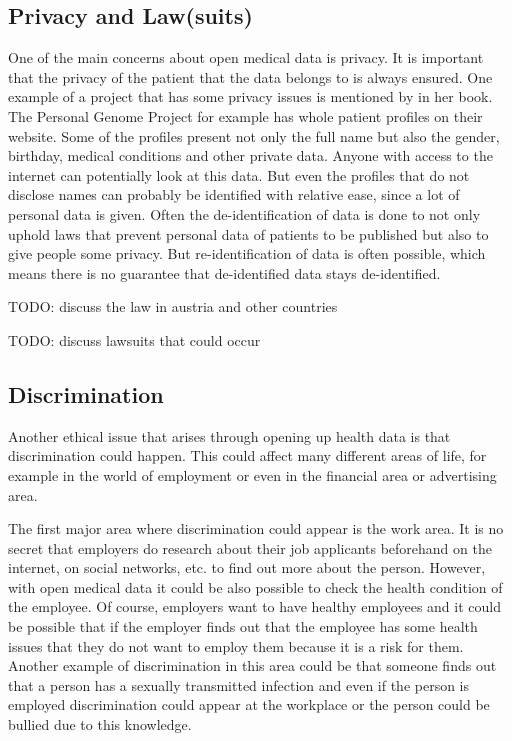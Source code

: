 \documentclass[a4paper, 11pt]{article}
\begin{document}
\subsection{Privacy and Law(suits)}
One of the main concerns about open medical data is privacy. It is important that the privacy of the patient that the data belongs to is always ensured. One example of a project that has some privacy issues is mentioned by \citet{Hoffman2015} in her book. The Personal Genome Project for example has whole patient profiles on their website. \cite{ParticipantProfiles} Some of the profiles present not only the full name but also the gender, birthday, medical conditions and other private data. Anyone with access to the internet can potentially look at this data. But even the profiles that do not disclose names can probably be identified with relative ease, since a lot of personal data is given. Often the de-identification of data is done to not only uphold laws that prevent personal data of patients to be published but also to give people some privacy. But re-identification of data is often possible, which means there is no guarantee that de-identified data stays de-identified. \cite{Hoffman2015, ParticipantProfiles}

TODO: discuss the law in austria and other countries

TODO: discuss lawsuits that could occur
\cite{Hoffman2015}

\subsection{Discrimination}
Another ethical issue that arises through opening up health data is that discrimination could happen. This could affect many different areas of life, for example in the world of employment or even in the financial area or advertising area. 

The first major area where discrimination could appear is the work area. It is no secret that employers do research about their job applicants beforehand on the internet, on social networks, etc. to find out more about the person. However, with open medical data it could be also possible to check the health condition of the employee. Of course, employers want to have healthy employees and it could be possible that if the employer finds out that the employee has some health issues that they do not want to employ them because it is a risk for them. Another example of discrimination in this area could be that someone finds out that  a person has a sexually transmitted infection and even if the person is employed discrimination could appear at the workplace or the person could be bullied due to this knowledge. \cite{price2019privacy}
\end{document}
